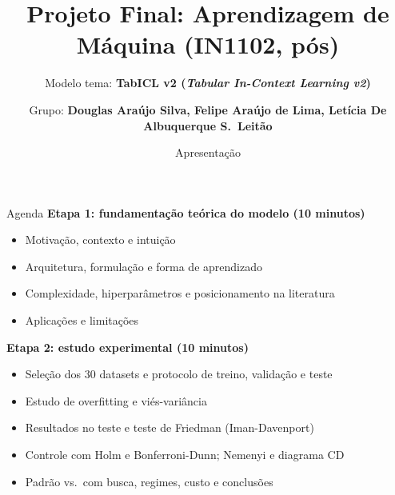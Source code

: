 \documentclass[aspectratio=169,11pt]{beamer}
\title[Projeto Final de AM (IN1102)]{Projeto Final: Aprendizagem de Máquina (IN1102, pós)}
\subtitle{Modelo tema: \textbf{TabICL v2 (\textit{Tabular In-Context Learning v2})}}
\author[Grupo: \textbf{Douglas, Felipe e Letícia}]{Grupo: \textbf{Douglas Araújo Silva, Felipe Araújo de Lima, Letícia De Albuquerque S.\ Leitão}}
\institute[CIn/UFPE]{Pós-graduação, CIn/UFPE, 2026.2}
\date{Apresentação}
\begin{document}
\begin{frame}
    \titlepage
\end{frame}

\begin{frame}{Agenda}
    \textbf{Etapa 1: fundamentação teórica do modelo (10 minutos)}
    \begin{itemize}
        \item Motivação, contexto e intuição
        \item Arquitetura, formulação e forma de aprendizado
        \item Complexidade, hiperparâmetros e posicionamento na literatura
        \item Aplicações e limitações
    \end{itemize}
    \textbf{Etapa 2: estudo experimental (10 minutos)}
    \begin{itemize}
        \item Seleção dos 30 datasets e protocolo de treino, validação e teste
        \item Estudo de overfitting e viés-variância
        \item Resultados no teste e teste de Friedman (Iman-Davenport)
        \item Controle com Holm e Bonferroni-Dunn; Nemenyi e diagrama CD
        \item Padrão vs.\ com busca, regimes, custo e conclusões
    \end{itemize}
\end{frame}

\end{document}
